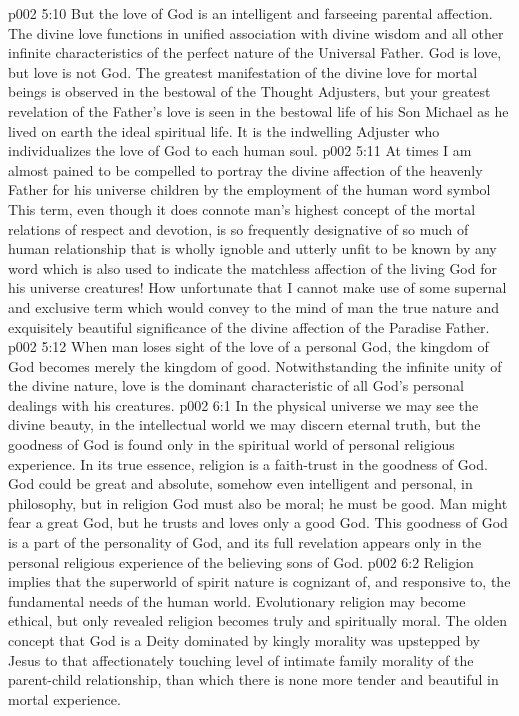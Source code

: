 \vs p002 5:10 But the love of God is an intelligent and farseeing parental affection. The divine love functions in unified association with divine wisdom and all other infinite characteristics of the perfect nature of the Universal Father. God is love, but love is not God. The greatest manifestation of the divine love for mortal beings is observed in the bestowal of the Thought Adjusters, but your greatest revelation of the Father’s love is seen in the bestowal life of his Son Michael as he lived on earth the ideal spiritual life. It is the indwelling Adjuster who individualizes the love of God to each human soul.
\pc \vs p002 5:11 At times I am almost pained to be compelled to portray the divine affection of the heavenly Father for his universe children by the employment of the human word symbol  This term, even though it does connote man’s highest concept of the mortal relations of respect and devotion, is so frequently designative of so much of human relationship that is wholly ignoble and utterly unfit to be known by any word which is also used to indicate the matchless affection of the living God for his universe creatures! How unfortunate that I cannot make use of some supernal and exclusive term which would convey to the mind of man the true nature and exquisitely beautiful significance of the divine affection of the Paradise Father.
\pc \vs p002 5:12 When man loses sight of the love of a personal God, the kingdom of God becomes merely the kingdom of good. Notwithstanding the infinite unity of the divine nature, love is the dominant characteristic of all God’s personal dealings with his creatures.
%
\vs p002 6:1 In the physical universe we may see the divine beauty, in the intellectual world we may discern eternal truth, but the goodness of God is found only in the spiritual world of personal religious experience. In its true essence, religion is a faith\hyp{}trust in the goodness of God. God could be great and absolute, somehow even intelligent and personal, in philosophy, but in religion God must also be moral; he must be good. Man might fear a great God, but he trusts and loves only a good God. This goodness of God is a part of the personality of God, and its full revelation appears only in the personal religious experience of the believing sons of God.
\vs p002 6:2 Religion implies that the superworld of spirit nature is cognizant of, and responsive to, the fundamental needs of the human world. Evolutionary religion may become ethical, but only revealed religion becomes truly and spiritually moral. The olden concept that God is a Deity dominated by kingly morality was upstepped by Jesus to that affectionately touching level of intimate family morality of the parent\hyp{}child relationship, than which there is none more tender and beautiful in mortal experience.
